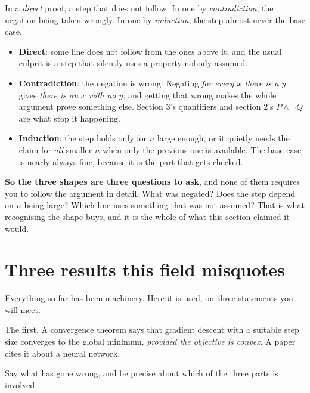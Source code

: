 \begin{fr}
\begin{ansblock}
In a \emph{direct} proof, a step that does not follow. In one by
\emph{contradiction}, the negation being taken wrongly. In one by
\emph{induction}, the step \dash{} almost never the base case.
\end{ansblock}

\begin{itemize}
\item \textbf{Direct}: some line does not follow from the ones above it, and
  the usual culprit is a step that silently uses a property nobody assumed.
\item \textbf{Contradiction}: the negation is wrong. Negating
  \emph{for every $x$ there is a $y$} gives \emph{there is an $x$ with no
  $y$}, and getting that wrong makes the whole argument prove something else.
  Section 3's quantifiers and section 2's $P \wedge \lnot Q$ are what stop
  it happening.
\item \textbf{Induction}: the step holds only for $n$ large enough, or it
  quietly needs the claim for \emph{all} smaller $n$ when only the previous
  one is available. The base case is nearly always fine, because it is the
  part that gets checked.
\end{itemize}

\textbf{So the three shapes are three questions to ask}, and none of them
requires you to follow the argument in detail. What was negated? Does the step
depend on $n$ being large? Which line uses something that was not assumed?
That is what recognising the shape buys, and it is the whole of what this
section claimed it would.
\end{fr}

\section{Three results this field misquotes}
\label{sec:P14-misquoted}

\begin{fr}
Everything so far has been machinery. Here it is used, on three statements you
will meet.

The first. A convergence theorem says that gradient descent with a suitable
step size converges to the global minimum, \emph{provided the objective is
convex}. A paper cites it about a neural network.

Say what has gone wrong, and be precise about which of the three parts is
involved.
\dotline
\nextframe
\end{fr}

